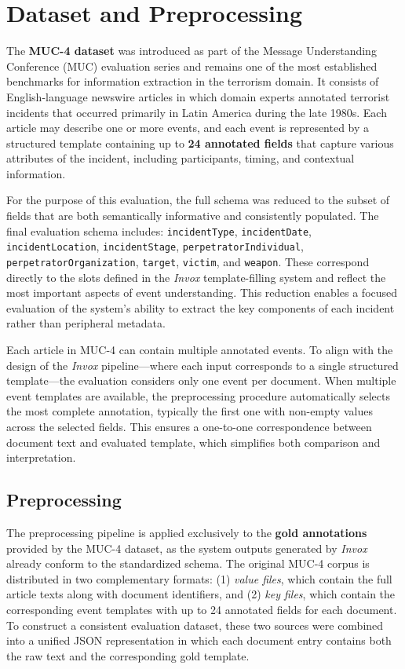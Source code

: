 \section{Dataset and Preprocessing}
\label{sec:eval-dataset}

The \textbf{MUC-4 dataset} was introduced as part of the Message Understanding Conference (MUC) evaluation series and remains one of the most established benchmarks for information extraction in the terrorism domain. It consists of English-language newswire articles in which domain experts annotated terrorist incidents that occurred primarily in Latin America during the late 1980s. Each article may describe one or more events, and each event is represented by a structured template containing up to \textbf{24 annotated fields} that capture various attributes of the incident, including participants, timing, and contextual information.

For the purpose of this evaluation, the full schema was reduced to the subset of fields that are both semantically informative and consistently populated. The final evaluation schema includes: \texttt{incidentType}, \texttt{incidentDate}, \texttt{incidentLocation}, \texttt{incidentStage}, \texttt{perpetratorIndividual}, \texttt{perpetratorOrganization}, \texttt{target}, \texttt{victim}, and \texttt{weapon}. These correspond directly to the slots defined in the \textit{Invox} template-filling system and reflect the most important aspects of event understanding. This reduction enables a focused evaluation of the system’s ability to extract the key components of each incident rather than peripheral metadata.

Each article in MUC-4 can contain multiple annotated events. To align with the design of the \textit{Invox} pipeline—where each input corresponds to a single structured template—the evaluation considers only one event per document. When multiple event templates are available, the preprocessing procedure automatically selects the most complete annotation, typically the first one with non-empty values across the selected fields. This ensures a one-to-one correspondence between document text and evaluated template, which simplifies both comparison and interpretation.

\subsection{Preprocessing}

The preprocessing pipeline is applied exclusively to the \textbf{gold annotations} provided by the MUC-4 dataset, as the system outputs generated by \textit{Invox} already conform to the standardized schema. The original MUC-4 corpus is distributed in two complementary formats: 
(1) \textit{value files}, which contain the full article texts along with document identifiers, and 
(2) \textit{key files}, which contain the corresponding event templates with up to 24 annotated fields for each document. 
To construct a consistent evaluation dataset, these two sources were combined into a unified JSON representation in which each document entry contains both the raw text and the corresponding gold template.

